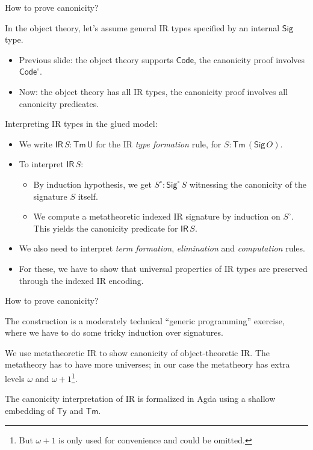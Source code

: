 \documentclass[dvipsnames,aspectratio=169]{beamer}
\newcommand{\ms}[1]{\mathsf{#1}}
\newcommand{\U}{\ms{U}}
\newcommand{\Sig}{\ms{Sig}}
\newcommand{\Code}{\ms{Code}}
\newcommand{\IR}{\ms{IR}}
\newcommand{\Ty}{\ms{Ty}}
\newcommand{\Tm}{\ms{Tm}}
\newcommand{\w}{\circ}
\begin{document}
\begin{frame}{How to prove canonicity?}

In the object theory, let's assume general IR types specified by an internal $\Sig$ type.
\begin{itemize}
\item Previous slide: the object theory supports $\Code$, the canonicity proof involves $\Code^\w$.
\pause
\item Now: the object theory has all IR types, the canonicity proof involves all canonicity predicates.
\end{itemize}
\vspace{1em}
\pause

Interpreting IR types in the glued model:
\begin{itemize}
 \item We write $\IR\,S : \Tm\,\U$ for the IR \emph{type formation} rule, for $S : \Tm\,(\Sig\,O)$.
 \pause
 \item To interpret $\IR\,S$:
   \begin{itemize}
     \item By induction hypothesis, we get $S^\w : \Sig^\w\,S$ witnessing the canonicity of the
       signature $S$ itself.
     \item We compute a metatheoretic indexed IR signature by induction on $S^\w$.
       This yields the canonicity predicate for $\IR\,S$.
   \end{itemize}
 \pause
 \item We also need to interpret \emph{term formation}, \emph{elimination} and \emph{computation} rules.
 \item For these, we have to show that universal properties of IR types are
       preserved through the indexed IR encoding.
\end{itemize}
\vspace{1em}
\end{frame}


\begin{frame}{How to prove canonicity?}

The construction is a moderately technical ``generic programming'' exercise,
where we have to do some tricky induction over signatures.
\vspace{1em}

We use metatheoretic IR to show canonicity of object-theoretic IR. The metatheory has
to have more universes; in our case the metatheory has extra levels $\omega$ and $\omega+1$\footnote{But $\omega+1$ is only used for convenience and could be omitted.}.
\vspace{1em}

The canonicity interpretation of IR is formalized in Agda using a shallow embedding of $\Ty$ and $\Tm$.

\end{frame}
\end{document}
